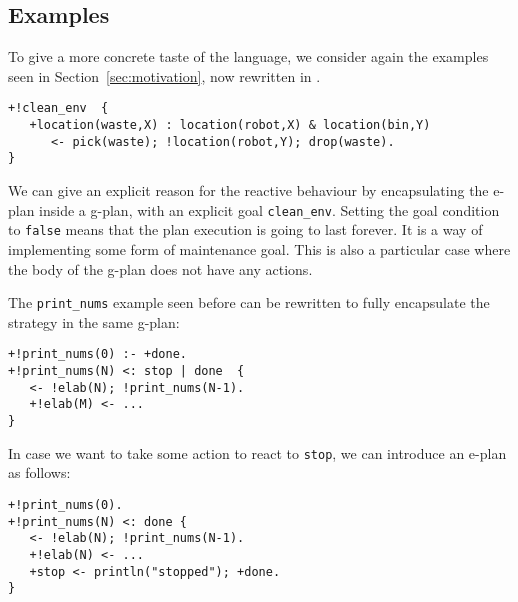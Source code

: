 %
\subsection{Examples}
To give a more concrete taste of the language, we consider again the
examples seen in Section~\ref{sec:motivation}, now rewritten in
{\aser}.
%

\begin{small}
\begin{verbatim}
+!clean_env  {
   +location(waste,X) : location(robot,X) & location(bin,Y)
      <- pick(waste); !location(robot,Y); drop(waste).
}
\end{verbatim}
\end{small}

\noindent We can give an explicit reason for the reactive behaviour by
encapsulating the e-plan inside a g-plan, with an explicit goal
\texttt{clean\_env}.
%
Setting the goal condition to \texttt{false} means that the plan
execution is going to last forever. It is a way of implementing some
form of maintenance goal.
%
This is also a particular case where the body of the g-plan does not
have any actions.
%

The \texttt{print\_nums} example seen before can be rewritten to fully
encapsulate the strategy in the same g-plan:

{\small
\begin{verbatim}
+!print_nums(0) :- +done.
+!print_nums(N) <: stop | done  {
   <- !elab(N); !print_nums(N-1).	
   +!elab(M) <- ...
}
\end{verbatim}}

  \noindent 
%
  In case we want to take some action to react to \texttt{stop}, we
  can introduce an e-plan as follows:

{\small
\begin{verbatim}
+!print_nums(0).
+!print_nums(N) <: done {
   <- !elab(N); !print_nums(N-1).
   +!elab(N) <- ...
   +stop <- println("stopped"); +done.
}
\end{verbatim}}

